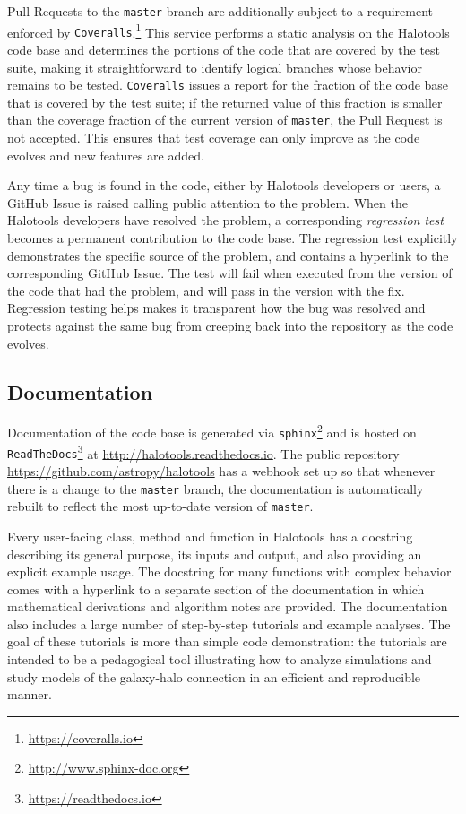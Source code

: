\documentclass[twocolumn, tighten]{aastex6}
\begin{document}
Pull Requests to the {\tt master} branch are additionally subject to a requirement enforced by {\tt Coveralls}.\footnote{\url{https://coveralls.io}} This service performs a static analysis on the Halotools code base and determines the portions of the code that are covered by the test suite, making it straightforward to identify logical branches whose behavior remains to be tested. {\tt Coveralls} issues a report for the fraction of the code base that is covered by the test suite; if the returned value of this fraction is smaller than the coverage fraction of the current version of {\tt master}, the Pull Request is not accepted. This ensures that test coverage can only improve as the code evolves and new features are added. 

Any time a bug is found in the code, either by Halotools developers or users, a GitHub Issue is raised calling public attention to the problem. When the Halotools developers have resolved the problem, a corresponding {\em regression test} becomes a permanent contribution to the code base. The regression test explicitly demonstrates the specific source of the problem, and contains a hyperlink to the corresponding GitHub Issue. The test will fail when executed from the version of the code that had the problem, and will pass in the version with the fix. Regression testing helps makes it transparent how the bug was resolved and protects against the same bug from creeping back into the repository as the code evolves. 

\subsection{Documentation}
\label{subsection:documentation}

Documentation of the code base is generated via {\tt sphinx}\footnote{\url{http://www.sphinx-doc.org}} and is hosted on {\tt ReadTheDocs}\footnote{\url{ https://readthedocs.io}} at \url{http://halotools.readthedocs.io}. The public repository \url{https://github.com/astropy/halotools} has a webhook set up so that whenever there is a change to the {\tt master} branch, the documentation is automatically rebuilt to reflect the most up-to-date version of {\tt master}. 

Every user-facing class, method and function in Halotools has a docstring describing its general purpose, its inputs and output, and also providing an explicit example usage. The docstring for many functions with complex behavior comes with a hyperlink to a separate section of the documentation in which mathematical derivations and algorithm notes are provided. The documentation also includes a large number of step-by-step tutorials and example analyses. The goal of these tutorials is more than simple code demonstration: the tutorials are intended to be a pedagogical tool illustrating how to analyze simulations and study models of the galaxy-halo connection in an efficient and reproducible manner. 
\end{document}
